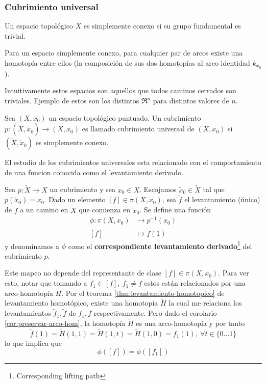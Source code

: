 \subsubsection{Cubrimiento universal}
\begin{definicion}
  Un espacio topológico \(X\) es simplemente conexo si su grupo
  fundamental es trivial.
\end{definicion}
\begin{acotacion}
  Para un espacio simplemente conexo, para cualquier par de arcos
  existe una homotopía entre ellos (la composición de sus dos homotopías
  al arco identidad \(k_{x_0}\)).
\end{acotacion}
Intuitivamente estos espacios son aquellos que todos caminos cerrados
son triviales. Ejemplo de estos son los distintos \(\Re^n\) para
distintos valores de \(n\).
\begin{definicion}
  Sea \(\left( X, x_0 \right)\) un espacio topológico puntuado. Un
  cubrimiento \(p : \left( \tilde X , \tilde x _0 \right) \to \left( X ,
    x _0 \right)\) es llamado cubrimiento universal de \( \left(
    X , x _0 \right)\) si \(\left( \tilde X , \tilde x _0
  \right)\) es simplemente conexo.
\end{definicion}
El estudio de los cubrimientos universales esta relacionado con el
comportamiento de una funcion conocida como el levantamiento derivado.
\begin{definicion} \label{def:levantamiento-derivado}
  Sea \(p : \tilde X \to X\) un cubrimiento y sea \(x_0 \in X\).
  Escojamos \(\tilde x _0 \in \tilde X\) tal que \(p(\tilde x _0) =
  x_0\). Dado un elemento \([f] \in \pi (X, x_0)\), sea \(\tilde f\) el
  levantamiento (único) de \(f\) a un camino en \(\tilde X\) que
  comienza en \(\tilde x _0\). Se define una función
  \begin{align*}
    \phi : \pi (X, x_0) &\longrightarrow p^{-1} (x_0) \\
    [f] &\longmapsto \tilde f (1)
  \end{align*}
  y denominamos a \(\phi\) como el \textbf{correspondiente levantamiento
  derivado}\footnote{Corresponding lifting path} del cubrimiento \(p\).
\end{definicion}
\begin{acotacion} \label{aco:indep-phi}
  Este mapeo no depende del representante de clase \([f] \in \pi \left(
    X, x_0 \right)\). Para ver esto, notar que tomando a \(f_1 \in [f]
  ,\ f_1 \neq f\) estos están relacionados por una arco-homotopía
  \(H\). Por el teorema \ref{thm:levantamiento-homotopico} de
  levantamiento homotópico, existe una homotopía \(\tilde H\) la cual me
  relaciona los levantamientos \(\tilde f_1 , \tilde f\) de \(f_1 , f\)
  respectivamente. Pero dado el corolario \ref{cor:preservar-arco-hom},
  la homotopía \(\tilde H\) es una arco-homotopía y por tanto
  \[ \tilde f (1) = \tilde H (1, 1) = \tilde H (1, t) = \tilde H (1, 0)
    = f_1 (1) ,\ \forall t \in \{0 \dotsc 1\} \]
  lo que implica que
  \[ \phi ([f]) = \phi ([f_1])\]
\end{acotacion}

